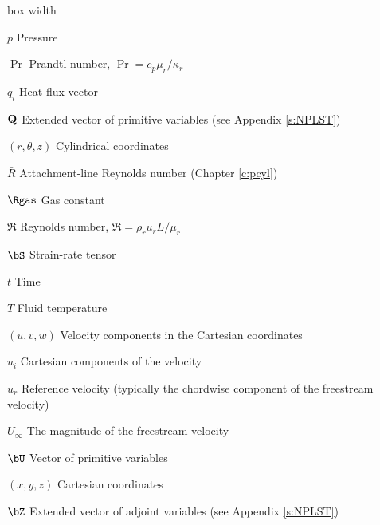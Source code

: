 \begin{descriptionlist}{box width}
\item[$p$]              Pressure

\item[$\Pr$]            Prandtl number, $\Pr = c_p \mu_r / \kappa_r$

\item[$q_i$]            Heat flux vector

\item[${\bf Q}$]	Extended vector of primitive variables
			(see Appendix \ref{s:NPLST})

\item[$(r,\theta,z)$]	Cylindrical coordinates

\item[$\bar R$]     	Attachment-line Reynolds number (Chapter \ref{c:pcyl})

\item[$\Rgas$]     	Gas constant

\item[$\Re$]            Reynolds number, $\Re = \rho_r u_r L / 
                        \mu_r$

\item[$\bS$]		Strain-rate tensor

\item[$t$]              Time

\item[$T$]              Fluid temperature

\item[$(u,v,w)$]        Velocity components in the Cartesian coordinates

\item[$u_i$]            Cartesian components of the velocity

\item[$u_r$]            Reference velocity (typically the chordwise component 
                        of the freestream velocity)

\item[$U_\infty$]	The magnitude of the freestream velocity

\item[$\bU$]		Vector of primitive variables

\item[$(x,y,z)$]        Cartesian coordinates

\item[$\bZ$]		Extended vector of adjoint variables
			(see Appendix \ref{s:NPLST})

\end{descriptionlist}

